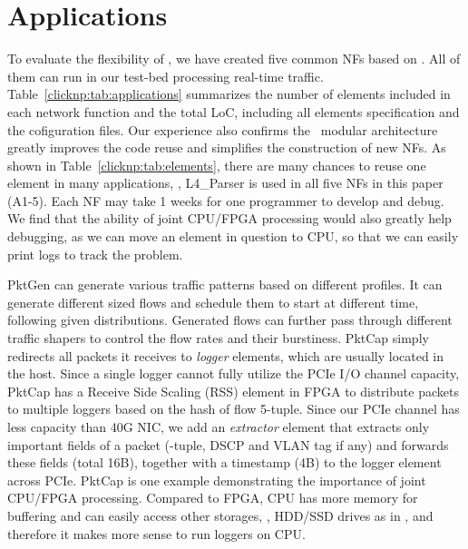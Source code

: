 \section{Applications}
\label{clicknp:sec:application}

To evaluate the flexibility of \name, we have created five common NFs based on \name. 
All of them can run in our test-bed processing real-time traffic. 
%
Table~\ref{clicknp:tab:applications} summarizes the number of elements included in each network function and the total LoC, including all elements specification and the cofiguration files.
%
Our experience also confirms the \name\ modular architecture greatly improves the code reuse and simplifies 
the construction of new NFs. 
As shown in Table~\ref{clicknp:tab:elements}, there are many chances to reuse one element in many applications, \eg, L4\_Parser 
is used in all five NFs in this paper (A1-5).
%
Each NF may take 1 weeks for one programmer to develop and debug. 
We find that the ability of joint CPU/FPGA processing would also greatly help 
debugging, as we can move 
an element in question to CPU, so that we can easily print logs to track the problem.


 PktGen can generate various
traffic patterns based on different profiles. 
It can generate different sized flows and schedule them to start at different time, 
following given distributions. 
%
Generated flows can further pass through different traffic shapers to control the flow rates and their burstiness. 
PktCap simply redirects all packets it receives to \textit{logger} elements, which are usually located in the host.
Since a single logger cannot fully utilize the PCIe I/O channel capacity, PktCap has a Receive Side Scaling (RSS)
element in FPGA to distribute packets to multiple loggers based on the hash of flow 5-tuple.
%
Since our PCIe channel has less capacity than 40G NIC, we add an \textit{extractor} element that extracts only important
fields of a packet (-tuple, DSCP and VLAN tag if any) and forwards these fields (total 16B), together with a timestamp
 (4B) to the logger element across PCIe.
%
PktCap is one example demonstrating the importance of joint CPU/FPGA processing. 
Compared to FPGA, CPU has 
more memory for buffering and can easily access other storages, \eg, HDD/SSD drives as in \cite{lee2015flosis}, and therefore it makes more sense to run loggers on CPU.

